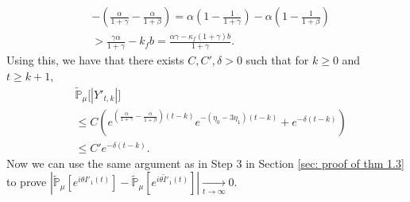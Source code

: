 \documentclass[12pt]{amsart}
\theoremstyle{plain}
\theoremstyle{definition}
\numberwithin{equation}{section}
\begin{document}
\begin{align}
\label{eq: condition for supercritical}
	&-(\frac{\alpha}{1+\gamma}-\frac{\alpha}{1+\beta})
    = \alpha(1-\frac{1}{1+\gamma}) - \alpha(1-\frac{1}{1+\beta})
    \\&> \frac{\gamma \alpha}{1+\gamma} - k_f b
    =\frac{\alpha \gamma-\kappa_f(1+\gamma)b}{1+\gamma}.
\end{align}
	Using this, we have that there exists $C,C',
    \delta > 0$ such that for $k\geq 0$ and $t\geq k+1$,
\begin{align*}
    &\mathbb{\tilde{P}}_{\mu}\big[|Y'_{t,k}|\big]
    \\& \leq C( e^{(\frac{\alpha}{1+\gamma} - \frac{\alpha}{1+\beta})(t-k)}e^{-(\eta_0 - 3\eta_1)(t-k)}+ e^{-\delta(t-k)})
    \\& \leq C'e^{-\delta (t-k)}.
\end{align*}
Now we can use the same argument as in Step 3 in Section \ref{sec: proof of thm 1.3} to prove $|\mathbb{\tilde{P}}_{\mu}[e^{i\theta I'_1(t)}]-\mathbb{\tilde{P}}_{\mu}[e^{i\theta\tilde I'_1(t)}]|\xrightarrow[t\to \infty]{} 0$.
\end{document}

